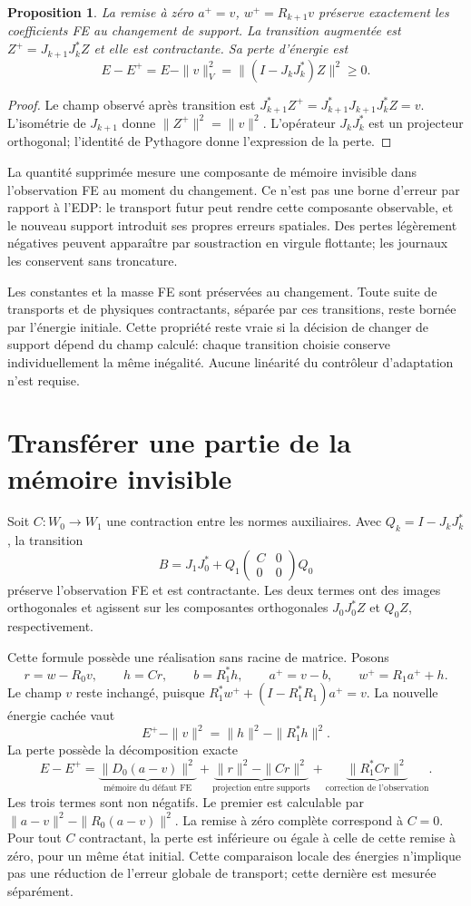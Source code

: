 \documentclass[11pt,a4paper]{article}
\newtheorem{proposition}{Proposition}
\begin{document}
\begin{proposition}
La remise à zéro $a^+=v$, $w^+=R_{k+1}v$ préserve exactement les coefficients
FE au changement de support. La transition augmentée est
$Z^+=J_{k+1}J_k^*Z$ et elle est contractante. Sa perte d'énergie est
\[
 E-E^+=E-\|v\|_V^2=\|(I-J_kJ_k^*)Z\|^2\geq0.
\]
\end{proposition}
\begin{proof}
Le champ observé après transition est
$J_{k+1}^*Z^+=J_{k+1}^*J_{k+1}J_k^*Z=v$.
L'isométrie de $J_{k+1}$ donne $\|Z^+\|^2=\|v\|^2$.
L'opérateur $J_kJ_k^*$ est un projecteur orthogonal; l'identité de
Pythagore donne l'expression de la perte.
\end{proof}

La quantité supprimée mesure une composante de mémoire invisible dans
l'observation FE au moment du changement. Ce n'est pas une borne d'erreur
par rapport à l'EDP: le transport futur peut rendre cette composante
observable, et le nouveau support introduit ses propres erreurs spatiales.
Des pertes légèrement négatives peuvent apparaître par soustraction en
virgule flottante; les journaux les conservent sans troncature.

Les constantes et la masse FE sont préservées au changement. Toute suite
de transports et de physiques contractants, séparée par ces transitions,
reste bornée par l'énergie initiale. Cette propriété reste vraie si la
décision de changer de support dépend du champ calculé: chaque transition
choisie conserve individuellement la même inégalité. Aucune linéarité du
contrôleur d'adaptation n'est requise.

\section{Transférer une partie de la mémoire invisible}
Soit $C:W_0\to W_1$ une contraction entre les normes auxiliaires.
Avec $Q_k=I-J_kJ_k^*$, la transition
\[
 B=J_1J_0^*+Q_1\begin{pmatrix}C&0\\0&0\end{pmatrix}Q_0
\]
préserve l'observation FE et est contractante. Les deux termes ont des
images orthogonales et agissent sur les composantes orthogonales
$J_0J_0^*Z$ et $Q_0Z$, respectivement.

Cette formule possède une réalisation sans racine de matrice. Posons
\[
 r=w-R_0v,\qquad h=Cr,\qquad b=R_1^*h,
 \qquad a^+=v-b,\qquad w^+=R_1a^++h.
\]
Le champ $v$ reste inchangé, puisque
$R_1^*w^++(I-R_1^*R_1)a^+=v$. La nouvelle énergie cachée vaut
\[
 E^+-\|v\|^2=\|h\|^2-\|R_1^*h\|^2.
\]
La perte possède la décomposition exacte
\[
 E-E^+=\underbrace{\|D_0(a-v)\|^2}_{\text{mémoire du défaut FE}}
       +\underbrace{\|r\|^2-\|Cr\|^2}_{\text{projection entre supports}}
       +\underbrace{\|R_1^*Cr\|^2}_{\text{correction de l'observation}}.
\]
Les trois termes sont non négatifs. Le premier est calculable par
$\|a-v\|^2-\|R_0(a-v)\|^2$. La remise à zéro complète correspond à
$C=0$. Pour tout $C$ contractant, la perte est inférieure ou égale à
celle de cette remise à zéro, pour un même état initial. Cette comparaison
locale des énergies n'implique pas une réduction de l'erreur globale de
transport; cette dernière est mesurée séparément.
\end{document}
